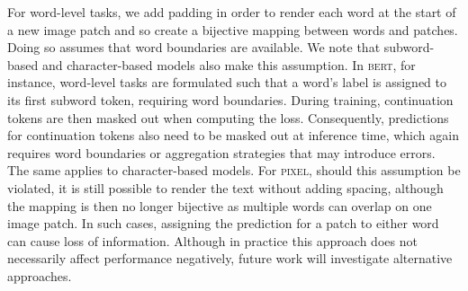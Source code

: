 \documentclass{article}
\newcommand{\model}{\textsc{pixel}\xspace}
\begin{document}
For word-level tasks, we add padding in order to render each word at the start of a new image patch and so create a bijective mapping between words and patches.
Doing so assumes that word boundaries are available. We note that subword-based and character-based models also make this assumption. In \textsc{bert}, for instance, word-level tasks are formulated such that a word's label is assigned to its first subword token, requiring word boundaries. During training, continuation tokens are then masked out when computing the loss. Consequently, predictions for continuation tokens also need to be masked out at inference time, which again requires word boundaries or aggregation strategies that may introduce errors. The same applies to character-based models. For \model, should this assumption be violated, it is still possible to render the text without adding spacing, although the mapping is then no longer bijective as multiple words can overlap on one image patch. In such cases, assigning the prediction for a patch to either word can cause loss of information. Although in practice this approach does not necessarily affect performance negatively, future work will investigate alternative approaches.
\end{document}
